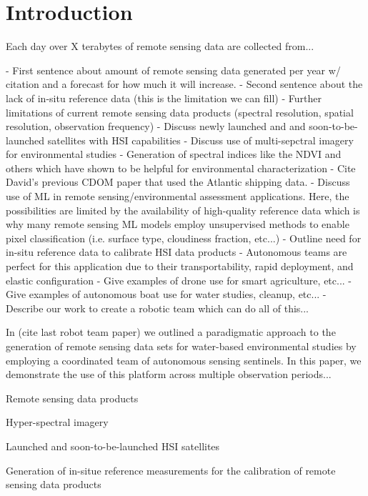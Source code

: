 \documentclass[journal,article,submit,pdftex,moreauthors]{Definitions/mdpi}
\begin{document}
\section{Introduction}

Each day over X terabytes of remote sensing data are collected from...

- First sentence about amount of remote sensing data generated per year w/ citation and a forecast for how much it will increase. 
- Second sentence about the lack of in-situ reference data (this is the limitation we can fill) 
- Further limitations of current remote sensing data products (spectral resolution, spatial resolution, observation frequency)
- Discuss newly launched and and soon-to-be-launched satellites with HSI capabilities
- Discuss use of multi-sepctral imagery for environmental studies
    - Generation of spectral indices like the NDVI and others which have shown to be helpful for environmental characterization
    - Cite David's previous CDOM paper that used the Atlantic shipping data.
- Discuss use of ML in remote sensing/environmental assessment applications. Here, the possibilities are limited by the availability of high-quality reference data which is why many remote sensing ML models employ unsupervised methods to enable pixel classification (i.e. surface type, cloudiness fraction, etc...)
- Outline need for in-situ reference data to calibrate HSI data products
- Autonomous teams are perfect for this application due to their transportability, rapid deployment, and elastic configuration
- Give examples of drone use for smart agriculture, etc... 
- Give examples of autonomous boat use for water studies, cleanup, etc... 
- Describe our work to create a robotic team which can do all of this... 



In (cite last robot team paper) we outlined a paradigmatic approach to the generation of remote sensing data sets for water-based environmental studies by employing a coordinated team of autonomous sensing sentinels. In this paper, we demonstrate the use of this platform across multiple observation periods...


Remote sensing data products 

Hyper-spectral imagery

Launched and soon-to-be-launched HSI satellites 

Generation of in-situe reference measurements for the calibration of remote sensing data products 
\end{document}
